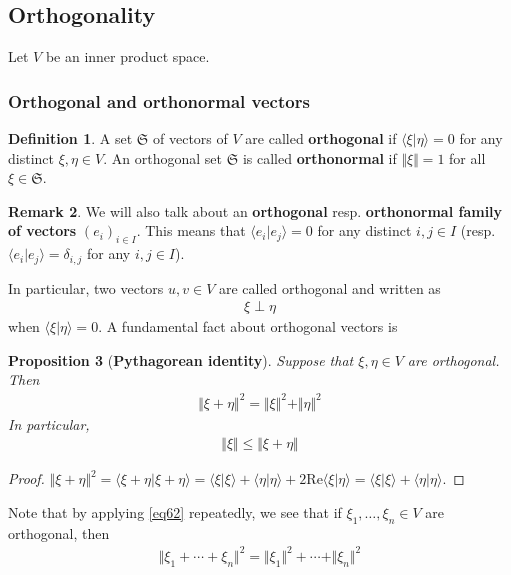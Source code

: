 \documentclass[12pt,b5paper,notitlepage]{article}
\theoremstyle{definition}
\newtheorem{df}{Definition}[subsection]
\newtheorem{rem}[df]{Remark}
\theoremstyle{plain}
\newtheorem{pp}[df]{Proposition}
\newcommand{\fk}{\mathfrak}
\newcommand{\bk}[1]{\langle {#1}\rangle}
\newcommand{\Real}{\mathrm{Re}}
\numberwithin{equation}{section}
\begin{document}
\subsection{Orthogonality}



Let $V$ be an inner product space.



\subsubsection{Orthogonal and orthonormal vectors}

\begin{df}
A set $\fk S$ of vectors of $V$ are called \textbf{orthogonal}  if $\bk{\xi|\eta}=0$ for any distinct $\xi,\eta\in V$. An orthogonal set $\fk S$ is called \textbf{orthonormal}  if $\Vert \xi\Vert=1$ for all $\xi\in \fk S$. 
\end{df}

\begin{rem}
We will also talk about an \textbf{orthogonal} resp.  \textbf{orthonormal family of vectors} $(e_i)_{i\in I}$. This means that $\bk{e_i|e_j}=0$ for any distinct $i,j\in I$ (resp. $\bk{e_i|e_j}=\delta_{i,j}$ for any $i,j\in I$). 
\end{rem}

In particular, two vectors $u,v\in V$ are called orthogonal and written as 
\begin{align*}
\xi\perp \eta
\end{align*}
when $\bk{\xi|\eta}=0$. A fundamental fact about orthogonal vectors is
\begin{pp}[\textbf{Pythagorean identity}]
Suppose that $\xi,\eta\in V$ are orthogonal. Then
\begin{align}\label{eq62}
\Vert \xi+\eta\Vert^2=\Vert \xi\Vert^2+\Vert \eta\Vert^2
\end{align}
In particular,
\begin{align}\label{eq63}
\Vert \xi\Vert\leq\Vert \xi+\eta\Vert
\end{align}
\end{pp}


\begin{proof}
$\Vert \xi+\eta\Vert^2=\bk{\xi+\eta|\xi+\eta}=\bk{\xi|\xi}+\bk{\eta|\eta}+2\Real \bk{\xi|\eta}=\bk{\xi|\xi}+\bk{\eta|\eta}$.
\end{proof}


Note that by applying \eqref{eq62} repeatedly, we see that if $\xi_1,\dots,\xi_n\in V$ are orthogonal, then
\begin{align}\label{eq64}
\Vert \xi_1+\cdots+\xi_n\Vert^2=\Vert \xi_1\Vert^2+\cdots+\Vert \xi_n\Vert^2
\end{align}
\end{document}
